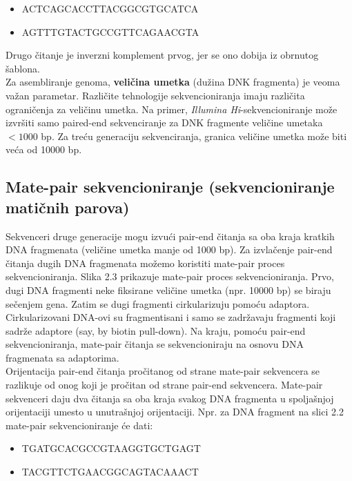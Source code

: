 \documentclass[12pt,oneside]{memoir}
\begin{document}
\begin{itemize}
    \item {ACTCAGCACCTTACGGCGTGCATCA}
    \item {AGTTTGTACTGCCGTTCAGAACGTA}
\end{itemize}

Drugo čitanje je inverzni komplement prvog, jer se ono dobija iz obrnutog šablona.\\

Za asembliranje genoma, \textbf{veličina umetka} (dužina DNK fragmenta) je veoma važan parametar. Različite tehnologije sekvencioniranja imaju različita ograničenja za veličinu umetka. Na primer, \textit{Illumina Hi}-sekvencioniranje može izvršiti samo paired-end sekvenciranje za DNK fragmente veličine umetaka $<1000$ bp. Za treću generaciju sekvenciranja, granica veličine umetka može biti veća od 10000 bp.\\


\subsection{Mate-pair sekvencioniranje (sekvencioniranje matičnih parova)}

Sekvenceri druge generacije mogu izvući pair-end čitanja sa oba kraja kratkih DNA fragmenata (veličine umetka manje od 1000 bp). Za izvlačenje pair-end čitanja dugih DNA fragmenata možemo koristiti mate-pair proces sekvencioniranja. Slika 2.3 prikazuje mate-pair proces sekvencioniranja.  Prvo, dugi DNA fragmenti neke fiksirane veličine umetka (npr. 10000 bp) se biraju sečenjem gena. Zatim se dugi fragmenti cirkularizuju pomoću adaptora. Cirkularizovani DNA-ovi su fragmentisani i samo se zadržavaju fragmenti koji sadrže adaptore (say, by biotin pull-down). Na kraju, pomoću pair-end sekvencioniranja, mate-pair čitanja se sekvencioniraju na osnovu DNA fragmenata sa adaptorima.\\

Orijentacija pair-end čitanja pročitanog od strane mate-pair sekvencera se razlikuje od onog koji je pročitan od strane pair-end sekvencera. Mate-pair sekvenceri daju dva čitanja sa oba kraja svakog DNA fragmenta u spoljašnjoj orijentaciji umesto u unutrašnjoj orijentaciji. Npr. za DNA fragment na slici 2.2 mate-pair sekvencioniranje će dati:
\begin{itemize}
    \item {TGATGCACGCCGTAAGGTGCTGAGT}
    \item {TACGTTCTGAACGGCAGTACAAACT}
\end{itemize}
\end{document}
